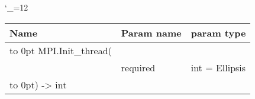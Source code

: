 \begingroup \catcode`\_=12 \tt
\begin{tabular}{lll}
\toprule
\textrm{Name}&\textrm{Param name}&\textrm{param type}\\
\midrule
\hbox to 0pt {MPI.Init_thread(\hss}\\
& required & int = Ellipsis\\
\hbox to 0pt{) -> int\hss}\\
\bottomrule
\end{tabular}
\endgroup
